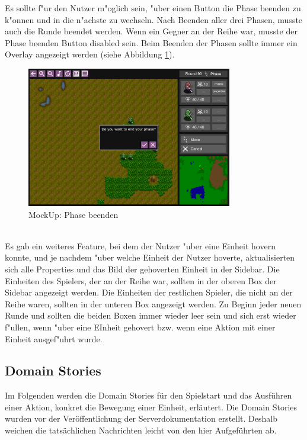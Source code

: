 \documentclass[12pt, titlepage]{scrartcl}
\newcounter{subsubsubsection}[subsubsection]
\begin{document}
			        Es sollte f"ur den Nutzer m"oglich sein, "uber einen Button die Phase beenden zu k"onnen und in die n"achste zu wechseln. Nach Beenden aller drei Phasen, musste auch die Runde beendet werden. Wenn ein Gegner an der Reihe war, musste der Phase beenden Button disabled sein. Beim Beenden der Phasen sollte immer ein Overlay angezeigt werden (siehe Abbildung \ref{Phase_End}). \\
			        \begin{figure}[H] 
    				    \centering
    				    \includegraphics[width=0.8\textwidth]{images/mockUps/EndPhase.png}
    				    \caption{MockUp: Phase beenden}
    				    \label{Phase_End}
			        \end{figure}
			        \ \\ Es gab ein weiteres Feature, bei dem der Nutzer "uber eine Einheit hovern konnte, und je nachdem "uber welche Einheit der Nutzer hoverte, aktualisierten sich alle Properties und das Bild der gehoverten Einheit in der Sidebar. Die Einheiten des Spielers, der an der Reihe war, sollten in der oberen Box der Sidebar angezeigt werden. Die Einheiten der restlichen Spieler, die nicht an der Reihe waren, sollten in der unteren Box angezeigt werden. Zu Beginn jeder neuen Runde und sollten die beiden Boxen immer wieder leer sein und sich erst wieder f"ullen, wenn "uber eine EInheit gehovert bzw. wenn eine Aktion mit einer Einheit ausgef"uhrt wurde.
		\subsection{Domain Stories}
		    Im Folgenden werden die Domain Stories f\"ur den Spielstart und das Ausf\"uhren einer Aktion, konkret die Bewegung einer Einheit, erl\"autert. Die Domain Stories wurden vor der Ver\"offentlichung der Serverdokumentation erstellt. Deshalb weichen die tats\"achlichen Nachrichten leicht von den hier Aufgef\"uhrten ab. \\
\end{document}
